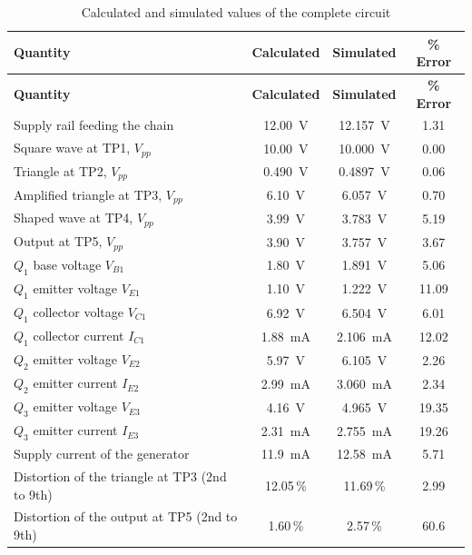 \documentclass[12pt,a4paper]{article}
\begin{document}
	\begin{longtable}{|l|c|c|c|}
		\caption{Calculated and simulated values of the complete circuit}
		\label{tab:compare}\\
		\hline
		\rowcolor{black!12}\textbf{Quantity} & \textbf{Calculated} & \textbf{Simulated} & \textbf{\% Error} \\
		\hline
		\endfirsthead
		\hline
		\rowcolor{black!12}\textbf{Quantity} & \textbf{Calculated} & \textbf{Simulated} & \textbf{\% Error} \\
		\hline
		\endhead
		\hline
		\endlastfoot
		Supply rail feeding the chain & \SI{12.00}{\volt} & \SI{12.157}{\volt} & 1.31 \\
		\hline
		Square wave at TP1, $V_{pp}$ & \SI{10.00}{\volt} & \SI{10.000}{\volt} & 0.00 \\
		\hline
		Triangle at TP2, $V_{pp}$ & \SI{0.490}{\volt} & \SI{0.4897}{\volt} & 0.06 \\
		\hline
		Amplified triangle at TP3, $V_{pp}$ & \SI{6.10}{\volt} & \SI{6.057}{\volt} & 0.70 \\
		\hline
		Shaped wave at TP4, $V_{pp}$ & \SI{3.99}{\volt} & \SI{3.783}{\volt} & 5.19 \\
		\hline
		Output at TP5, $V_{pp}$ & \SI{3.90}{\volt} & \SI{3.757}{\volt} & 3.67 \\
		\hline
		$Q_1$ base voltage $V_{B1}$ & \SI{1.80}{\volt} & \SI{1.891}{\volt} & 5.06 \\
		\hline
		$Q_1$ emitter voltage $V_{E1}$ & \SI{1.10}{\volt} & \SI{1.222}{\volt} & 11.09 \\
		\hline
		$Q_1$ collector voltage $V_{C1}$ & \SI{6.92}{\volt} & \SI{6.504}{\volt} & 6.01 \\
		\hline
		$Q_1$ collector current $I_{C1}$ & \SI{1.88}{\milli\ampere} & \SI{2.106}{\milli\ampere} & 12.02 \\
		\hline
		$Q_2$ emitter voltage $V_{E2}$ & \SI{5.97}{\volt} & \SI{6.105}{\volt} & 2.26 \\
		\hline
		$Q_2$ emitter current $I_{E2}$ & \SI{2.99}{\milli\ampere} & \SI{3.060}{\milli\ampere} & 2.34 \\
		\hline
		$Q_3$ emitter voltage $V_{E3}$ & \SI{4.16}{\volt} & \SI{4.965}{\volt} & 19.35 \\
		\hline
		$Q_3$ emitter current $I_{E3}$ & \SI{2.31}{\milli\ampere} & \SI{2.755}{\milli\ampere} & 19.26 \\
		\hline
		Supply current of the generator & \SI{11.9}{\milli\ampere} & \SI{12.58}{\milli\ampere} & 5.71 \\
		\hline
		Distortion of the triangle at TP3 (2nd to 9th) & 12.05\,\% & 11.69\,\% & 2.99 \\
		\hline
		Distortion of the output at TP5 (2nd to 9th) & 1.60\,\% & 2.57\,\% & 60.6 \\
		\hline
	\end{longtable}
\end{document}

